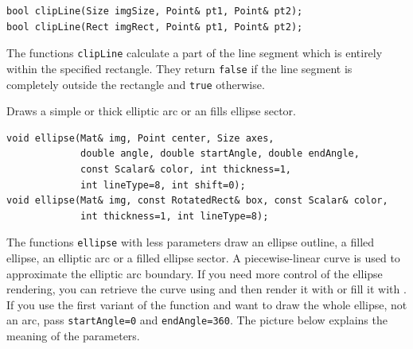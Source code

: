 \begin{lstlisting}
bool clipLine(Size imgSize, Point& pt1, Point& pt2);
bool clipLine(Rect imgRect, Point& pt1, Point& pt2);
\end{lstlisting}
\begin{description}
\end{description}

The functions \texttt{clipLine} calculate a part of the line
segment which is entirely within the specified rectangle.
They return \texttt{false} if the line segment is completely outside the rectangle and \texttt{true} otherwise.


\label{ellipse}
Draws a simple or thick elliptic arc or an fills ellipse sector.

\begin{lstlisting}
void ellipse(Mat& img, Point center, Size axes,
             double angle, double startAngle, double endAngle,
             const Scalar& color, int thickness=1,
             int lineType=8, int shift=0);
void ellipse(Mat& img, const RotatedRect& box, const Scalar& color,
             int thickness=1, int lineType=8);
\end{lstlisting}
\begin{description}
\end{description}

The functions \texttt{ellipse} with less parameters draw an ellipse outline, a filled ellipse, an elliptic
arc or a filled ellipse sector. 
A piecewise-linear curve is used to approximate the elliptic arc boundary. If you need more control of the ellipse rendering, you can retrieve the curve using  and then render it with  or fill it with . If you use the first variant of the function and want to draw the whole ellipse, not an arc, pass \texttt{startAngle=0} and \texttt{endAngle=360}. The picture below
explains the meaning of the parameters.

